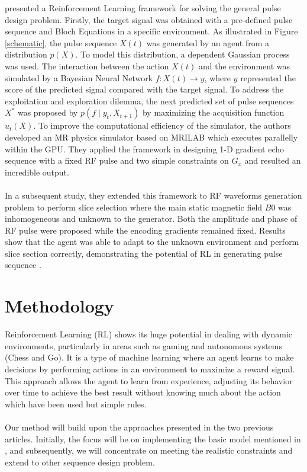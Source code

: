 \citet{0438} presented a Reinforcement Learning framework for solving the general pulse design problem. Firstly, the target signal was obtained with a pre-defined pulse sequence and Bloch Equations in a specific environment. As illustrated in Figure \ref{schematic}, the pulse sequence $X(t)$ was generated by an agent from a distribution $p(X)$. To model this distribution, a dependent Gaussian process was used. The interaction between the action $X(t)$ and the environment was simulated by a Bayesian Neural Network $f:X(t) \rightarrow y$, where $y$ represented the score of the predicted signal compared with the target signal. To address the exploitation and exploration dilemma, the next predicted set of pulse sequences $X^*$ was proposed by $p\left(f \mid y_t, X_{t+1}\right)$ by maximizing the acquisition function $u_t(X)$. To improve the computational efficiency of the simulator, the authors developed an MR physics simulator based on MRILAB \citep{MRILAB} which executes parallelly within the GPU. They applied the framework in designing 1-D gradient echo sequence with a fixed RF pulse and two simple constraints on $G_x$ and resulted an incredible output. 
\\\\
In a subsequent study, they extended this framework to RF waveforms generation problem to perform slice selection where the main static magnetic field $B0$ was inhomogeneous and unknown to the generator. Both the amplitude and phase of RF pulse were proposed while the encoding gradients remained fixed. Results show that the agent was able to adapt to the unknown environment and perform slice section correctly, demonstrating the potential of RL in generating pulse sequence \cite{0477}.

\section{Methodology}
Reinforcement Learning (RL) shows its huge potential in dealing with dynamic environments, particularly in areas such as gaming and autonomous systems (Chess and Go). It is a type of machine learning where an agent learns to make decisions by performing actions in an environment to maximize a reward signal. This approach allows the agent to learn from experience, adjusting its behavior over time to achieve the best result without knowing much about the action which have been used but simple rules.
\\\\
Our method will build upon the approaches presented in the two previous articles. Initially, the focus will be on implementing the basic model mentioned in \citep{0438}, and subsequently, we will concentrate on meeting the realistic constraints and extend to other sequence design problem. 
